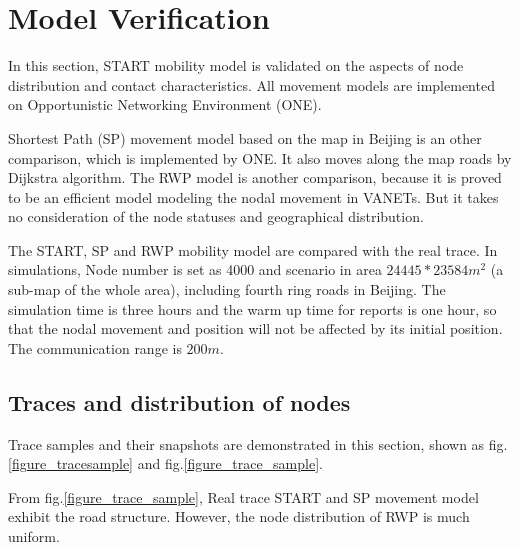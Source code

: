 \section{Model Verification}
\label{section_model_varification}
In this section, START mobility model is validated on the aspects of node distribution and contact characteristics. All movement models are implemented on Opportunistic Networking Environment (ONE)\cite{KeranenOtt-155}.

Shortest Path (SP) movement model based on the map in Beijing is an other comparison, which is implemented by ONE.  It also moves along the map roads by Dijkstra algorithm.
The RWP model is another comparison, because it is proved to be an efficient model modeling the nodal movement in VANETs. But it takes no consideration of the node statuses and geographical distribution.

The START, SP and RWP mobility model are compared with the real trace.
In simulations, Node number is set as 4000 and scenario in area $24445*23584 m^2$ (a sub-map of the whole area), including fourth ring roads in Beijing. The simulation time is three hours and the warm up time for reports is one hour, so that the nodal movement and position will not be affected by its initial position. The communication range is $200m$.

\subsection{Traces and distribution of nodes}

Trace samples and their snapshots are demonstrated in this section, shown as fig. \ref{figure_tracesample} and fig.\ref{figure_trace_sample}.

From fig.\ref{figure_trace_sample}, Real trace START and SP movement model exhibit the road structure. However, the node distribution of RWP is much uniform.



